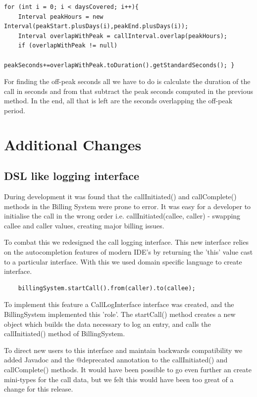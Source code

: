 \documentclass[pdftex,11pt,a4paper]{article}
\begin{document}
\begin{lstlisting}
for (int i = 0; i < daysCovered; i++){
	Interval peakHours = new Interval(peakStart.plusDays(i),peakEnd.plusDays(i));
	Interval overlapWithPeak = callInterval.overlap(peakHours);
	if (overlapWithPeak != null)
		peakSeconds+=overlapWithPeak.toDuration().getStandardSeconds(); }
\end{lstlisting}

For finding the off-peak seconds all we have to do is calculate the duration of the call in seconds and from that subtract the peak seconds computed in the previous method. In the end, all that is left are the seconds overlapping the off-peak period.

\section{Additional Changes}

\subsection{DSL like logging interface}
During development it was found that the callInitiated() and callComplete() methods in the Billing System were prone to error. It was easy for a developer to initialise the call in the wrong order i.e. callInitiated(callee, caller) - swapping callee and caller values, creating major billing issues.

To combat this we redesigned the call logging interface. This new interface relies on the autocompletion features of modern IDE's by returning the 'this' value cast to a particular interface. With this we used domain specific language to create interface.
\begin{lstlisting}
	billingSystem.startCall().from(caller).to(callee);
\end{lstlisting}
To implement this feature a CallLogInterface interface was created, and the BillingSystem implemented this 'role'. The startCall() method creates a new object which builds the data necessary to log an entry, and calls the callInitiated() method of BillingSystem.

To direct new users to this interface and maintain backwards compatibility we added Javadoc and the @deprecated annotation to the callInitiated()  and callComplete() methods. It would have been possible to go even further an create mini-types for the call data, but we felt this would have been too great of a change for this release.
\end{document}
